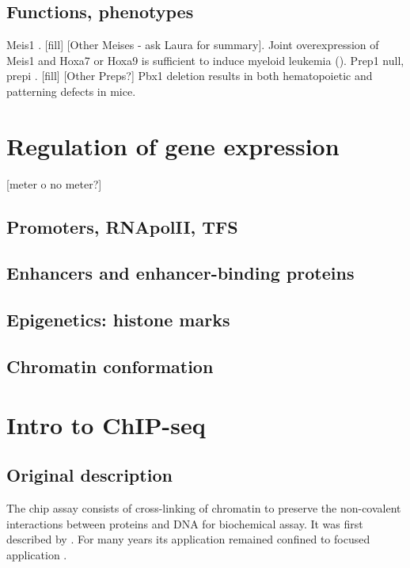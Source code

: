 \subsection{Functions, phenotypes}

		Meis1  \cite{Azcoitia2005, Carramolino2010}. [fill] [Other Meises - ask Laura for summary]. Joint overexpression of Meis1 and Hoxa7 or Hoxa9 is sufficient to induce myeloid leukemia (\cite{Nakamura1996}).
		Prep1 null, \ac{prepi} \cite{Ferretti2006, Fernandez-Diaz2010, Longobardi2010}. [fill] [Other Preps?]
		Pbx1 deletion results in both hematopoietic \cite{DiMartino2001} and patterning \cite{Selleri et al. 2001} defects in mice.

\section{Regulation of gene expression}
[meter o no meter?]
\subsection{Promoters, RNApolII, TFS}

\subsection{Enhancers and enhancer-binding proteins}

\subsection{Epigenetics: histone marks}

\subsection{Chromatin conformation}

\section{Intro to ChIP-seq}

\subsection{Original description}
The \ac{chip} assay consists of cross-linking of chromatin to preserve the non-covalent interactions between proteins and DNA for biochemical assay. It was first described by \cite{Solomon1988}. For many years its application remained confined to focused application \cite{Mardis2007}.  

